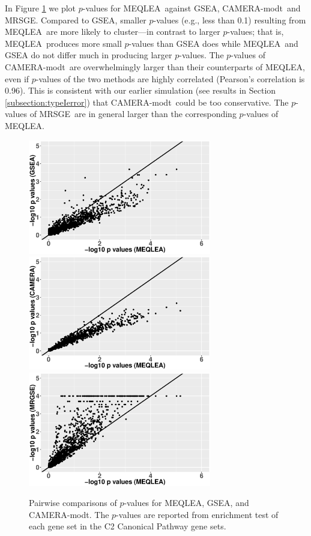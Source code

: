 \documentclass[a4,center,fleqn]{NAR}
\newcommand{\OurMethod}{MEQLEA}
\newcommand{\CMT}{CAMERA-modt}
\newcommand{\genr}{MRSGE}
\begin{document}
	In Figure \ref{fig:HDdatap} we plot $p$-values for \OurMethod~against GSEA, \CMT~and \genr.
	Compared to GSEA, smaller $p$-values (e.g., less than 0.1) resulting from \OurMethod~are more likely
	to cluster---in contrast to larger $p$-values; that is, \OurMethod~produces more small $p$-values
	than GSEA does while \OurMethod~and GSEA do not differ much in producing larger $p$-values. The
	$p$-values of \CMT~are overwhelmingly larger than their counterparts of \OurMethod, even if
	$p$-values of the two methods are highly correlated (Pearson's correlation is 0.96). This is
	consistent with our earlier simulation (see results in Section \ref{subsection:typeIerror}) that
	\CMT~could be too conservative. The $p$-values of \genr~are in general larger than the corresponding
	$p$-values of \OurMethod. 
	\begin{figure}[!ht]
		\begin{center}
			\includegraphics[width=8cm,height=5cm]{Figures/MEQLEA_GSEA.eps}
			\includegraphics[width=8cm,height=5cm]{Figures/MEQLEA_Camera.eps}
			\includegraphics[width=8cm,height=5cm]{Figures/MEQLEA_MRGSE.eps}
		\end{center} 
		\caption{Pairwise comparisons of $p$-values for \OurMethod, GSEA, and \CMT. The $p$-values are
			reported from enrichment test of each gene set in the C2 Canonical Pathway gene sets.
		}\label{fig:HDdatap}
	\end{figure} 
	
\end{document}
